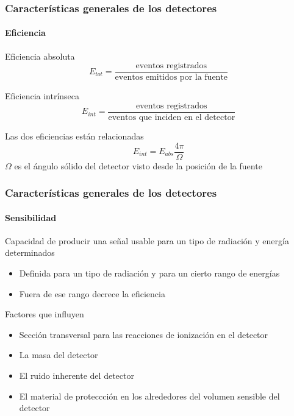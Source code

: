 \documentclass{beamer}
\begin{document}
\begin{frame}
\frametitle{Caracter\'isticas generales de los detectores}
\framesubtitle{{\color{blue}Eficiencia}}
\begin{block}{Eficiencia absoluta} 
$$\textit{E}_{tot} = \frac{\text{eventos registrados}}{\text{eventos emitidos por
la fuente}}$$
\end{block}
\begin{block}{Eficiencia intr\'inseca} 
$$\textit{E}_{int} = \frac{\text{eventos registrados}}{\text{eventos que inciden
en el detector}}$$
\end{block}
\begin{block}{Las dos eficiencias est\'an relacionadas} 
$$\textit{E}_{int} = \textit{E}_{abs} \frac{4 \pi}{\Omega}$$
$\Omega$ es el \'angulo s\'olido del detector visto desde la posici\'on de la fuente 
\end{block}
\end{frame} 

\begin{frame}
\frametitle{Caracter\'isticas generales de los detectores}
\framesubtitle{{\color{blue}Sensibilidad}}
\begin{exampleblock}{}
Capacidad de producir una señal usable para un tipo de radiaci\'on y energ\'ia
determinados 
\end{exampleblock}
\begin{alertblock}{}
\begin{itemize}
\item Definida para un tipo de radiaci\'on y para un cierto rango de
energ\'ias 
\item Fuera de ese rango decrece la \alert{eficiencia}
\end{itemize}
\end{alertblock}
\begin{block}{Factores que influyen}
\begin{itemize}
\item Secci\'on transversal para las reacciones de ionizaci\'on en el
detector
\item La masa del detector 
\item	El ruido inherente del detector
\item	El material de proteccci\'on en los alrededores del volumen sensible
del detector 
\end{itemize}
\end{block}
\end{frame} 
\end{document}
